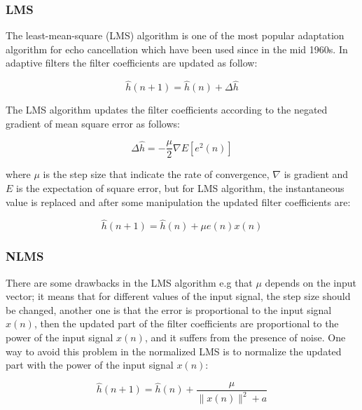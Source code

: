 \documentclass[a4paper,11pt,twoside]{article}
\begin{document}
\subsubsection{LMS}


The least-mean-square (LMS) algorithm is one of the most popular adaptation algorithm for echo cancellation which have been used since in the mid 1960s\cite{5}. In adaptive filters the filter coefficients are updated as follow:

\begin{equation}
\hat{h}(n+1) = \hat{h}(n) + \Delta \hat{h} 
\end{equation}

 The LMS algorithm updates the filter coefficients  according to the negated gradient of mean square error as follows:

\begin{equation}
\Delta \hat{h} = - \frac{\mu}{2} \nabla E[e^2(n)] 
\end{equation}

where $\mu$ is the step size that indicate the rate of convergence, $\nabla$ is gradient and $E$ is the expectation of square error, but for LMS algorithm, the instantaneous value is replaced and after some manipulation the updated filter coefficients are:

\begin{equation}
\hat{h}(n+1) = \hat{h}(n) + \mu e(n) x(n) 
\end{equation}

\subsubsection{NLMS}
There are some drawbacks in the LMS algorithm e.g that $\mu$ depends on the input vector; it means that for different values of the input signal, the step size should be changed, another one is that  the error is proportional to the input signal $x(n)$, then the updated part of the filter coefficients are proportional to the power of the input signal $x(n)$, and it suffers from the presence of noise. One way to avoid this problem in the normalized LMS is to normalize the updated part with the power of the input signal $x(n)$:

\begin{equation}
\hat{h}(n+1) = \hat{h}(n) + \frac{\mu}{\parallel x(n) \parallel ^2 + a}
\end{equation}
\end{document}
